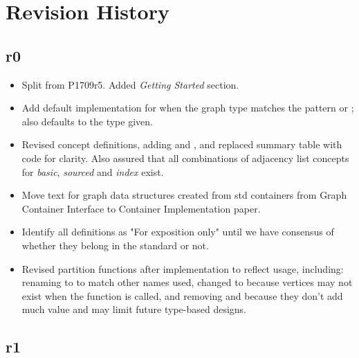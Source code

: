 \section{Revision History}

\subsection*{\paperno r0}

\begin{itemize}
      \item Split from P1709r5. Added \textit{Getting Started} section.
      \item Add default implementation for  when the graph type matches the 
            pattern  or ;
             also defaults to the  type given.
      \item Revised concept definitions, adding  and , and replaced
            summary table with code for clarity. Also assured that all combinations of adjacency list concepts for
            \textit{basic}, \textit{sourced} and \textit{index} exist.
      \item Move text for graph data structures created from std containers from Graph Container Interface to 
            Container Implementation paper.
      \item Identify all  definitions as "For exposition only" until we have consensus of whether they 
            belong in the standard or not.
      \item Revised partition functions after implementation to reflect usage, including: renaming  
            to  to match other names used, changed  to 
            because vertices may not exist when the function is called, and removing  and 
             because they don't add much value and may limit future type-based designs.
\end{itemize}

\subsection*{\paperno r1}

